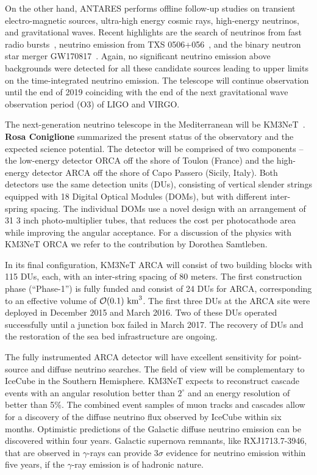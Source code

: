 \documentclass{PoS}
\begin{document}
On the other hand, ANTARES performs offline follow-up studies on transient electro-magnetic sources, ultra-high energy cosmic rays, high-energy neutrinos, and gravitational waves. Recent highlights are the search of neutrinos from fast radio bursts~\cite{Albert:2018euo}, neutrino emission from TXS 0506+056~\cite{Albert:2018kjg}, and the binary neutron star merger GW170817~\cite{ANTARES:2017bia}. Again, no significant neutrino emission above backgrounds were detected for all these candidate sources leading to upper limits on the time-integrated neutrino emission. The telescope will continue observation until the end of 2019 coinciding with the end of the next gravitational wave observation period (O3) of LIGO and VIRGO.

The next-generation neutrino telescope in the Mediterranean will be KM3NeT~\cite{Adrian-Martinez:2016fdl}. {\bf Rosa Coniglione} summarized the present status of the observatory and the expected science potential. The detector will be comprised of two components -- the low-energy detector ORCA off the shore of Toulon (France) and the high-energy detector ARCA  off the shore of Capo Passero (Sicily, Italy). Both detectors use the same detection units (DUs), consisting of vertical slender strings equipped with 18 Digital Optical Modules (DOMs), but with different inter-spring spacing. The individual DOMs use a novel design with an arrangement of 31 3 inch photo-multiplier tubes, that reduces the cost per photocathode area while improving the angular acceptance. For a discussion of the physics with KM3NeT ORCA we refer to the contribution by Dorothea Samtleben.

In its final configuration, KM3NeT ARCA will consist of two building blocks with 115 DUs, each, with an inter-string spacing of 80 meters. The first construction phase (``Phase-1'') is fully funded and consist of 24 DUs for ARCA, corresponding to an effective volume of $\mathcal{O}(0.1)~{\rm km}^{3}$. The first three DUs at the ARCA site were deployed in December 2015 and March 2016. Two of these DUs operated successfully until a junction box failed in March 2017. The recovery of DUs and the restoration of the sea bed infrastructure are ongoing.

The fully instrumented ARCA detector will have excellent sensitivity for point-source and diffuse neutrino searches. The field of view will be complementary to IceCube in the Southern Hemisphere. KM3NeT expects to reconstruct cascade events with an angular resolution better than $2^\circ$ and an energy resolution of better than 5\%. The combined event samples of muon tracks and cascades allow for a discovery of the diffuse neutrino flux observed by IceCube within six months. Optimistic predictions of the Galactic diffuse neutrino emission can be discovered within four years. Galactic supernova remnants, like RXJ1713.7-3946, that are observed in $\gamma$-rays can provide $3\sigma$ evidence for neutrino emission within five years, if the $\gamma$-ray emission is of hadronic nature.
\end{document}
